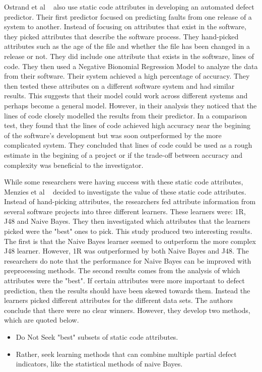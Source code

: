 \documentclass{sig-alternate}
\begin{document}
Ostrand et al ~\cite{Ostrand04} also use static code attributes in developing an automated defect predictor.  Their first predictor focused on predicting faults from one release of a system to another.  Instead of focusing on attributes that exist in the software, 
they picked attributes that describe the software process.  They hand-picked attributes such as the age of the file and whether the file has been changed in a release or not.  
They did include one attribute that exists in the software, lines of code.  They then used a Negative Bionomial Regression Model to analyze the data from their software.  Their system achieved a high percentage of accuracy.
They then tested these attributes on a different software system and had similar results.  This suggests that their model could work across different systems and perhaps become a general model.  However, in their analysis they noticed
that the lines of code closely modelled the results from their predictor.  In a comparison test, they found that the lines of code achieved high accuracy near the begining of the software's development but was soon outperformed by the
more complicated system.  They concluded that lines of code could be used as a rough estimate in the begining of a project or if the trade-off between accuracy and complexity was beneficial to the investigator. 

While some researchers were having success with these static code attributes, Menzies et al ~\cite{Menzies07} decided to investigate the value of these static code attributes.  Instead of hand-picking attributes, the researchers fed attribute information
from several software projects into three different learners.  These learners were: 1R, J48 and Naive Bayes.   They then investigated which attributes that the learners picked were the "best" ones to pick.
This study produced two interesting results.  The first is that the Naive Bayes learner seemed to outperform the more complex J48 learner.  However, 1R was outperformed by both Naive Bayes and J48.  The researchers do note that the performance for Naive Bayes can be improved with preprocessing methods.  The second results comes from the analysis of which attributes were the "best".  If certain attributes were more important to defect prediction, then the results should have been skewed towards them.  Instead the learners picked different attributes for the different data sets.  The authors conclude that there were no clear winners.  However, they develop two methods, which are quoted below.

\begin{itemize}
\item{Do Not Seek "best" subsets of static code attributes.}
\item{Rather, seek learning methods that can combine multiple partial defect indicators, like the statistical methods of naive Bayes.}
\end{itemize}
       
\end{document}
